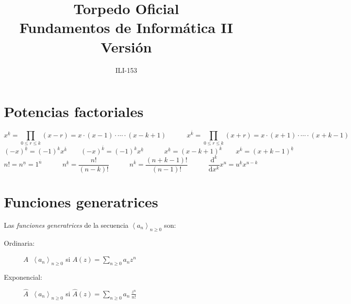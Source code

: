 \documentclass[fleqn, spanish]{article}
\title{Torpedo Oficial\\
       Fundamentos de Informática II\\
       {\normalsize Versión \classversion}}
\author{ILI-153}
\DeclareMathOperator{\ogf}{\stackrel{\text{ogf}}{\longleftrightarrow}}
\DeclareMathOperator{\egf}{\stackrel{\text{egf}}{\longleftrightarrow}}
\begin{document}

\maketitle
\thispagestyle{empty}

\section*{Potencias factoriales}
\label{sec:potencias-factoriales}

  \begin{equation*}
    x^{\underline{k}}
      = \prod_{0 \le r	\le k} (x - r)
      = x \cdot (x - 1) \cdot \dotsm \cdot (x - k + 1)
    \hspace{3em}
    x^{\overline{k}}
      = \prod_{0 \le r	\le k} (x + r)
      = x \cdot (x + 1) \cdot \dotsm \cdot (x + k - 1)
  \end{equation*}
  \begin{equation*}
    (-x)^{\underline{k}}
      = (-1)^k x^{\overline{k}}
    \qquad
    (-x)^{\overline{k}}
      = (-1)^k x^{\underline{k}}
    \hspace{3em}
    x^{\underline{k}}
      = (x - k + 1)^{\overline{k}}
    \qquad
    x^{\overline{k}}
      = (x + k - 1)^{\underline{k}}
  \end{equation*}
  \begin{equation*}
    n!
      = n^{\underline{n}}
      = 1^{\overline{n}}
    \hspace{3em}
    n^{\underline{k}}
      = \frac{n!}{(n - k)!}
    \hspace{3em}
    n^{\overline{k}}
      = \frac{(n + k - 1)!}{(n - 1)!}
    \hspace{3em}
    \frac{\mathrm{d}^k}{\mathrm{d} x^k} x^u
      = u^{\underline{k}} x^{u - k}
  \end{equation*}

\section*{Funciones generatrices}
\label{sec:funciones-generatrices}

  Las \emph{funciones generatrices}
  de la secuencia \(\left\langle a_n \right\rangle_{n \ge 0}\) son:
  \begin{description}
  \item[Ordinaria:]
    \(A \ogf \left\langle a_n \right\rangle_{n \ge 0}\)
    si \(A(z) = \sum_{n \ge 0} a_n z^n\)
  \item[Exponencial:]
    \(\widehat{A}
	\egf \left\langle a_n \right\rangle_{n \ge 0}\)
    si \(\widehat{A}(z) = \sum_{n \ge 0} a_n \, \frac{z^n}{n!}\)
  \end{description}
\end{document}

